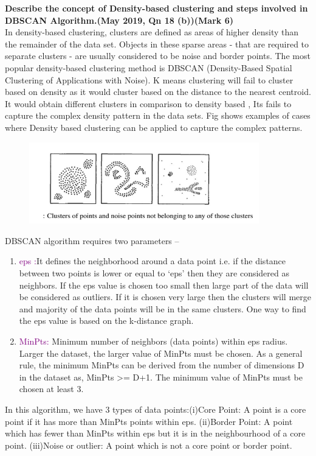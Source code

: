 
\textbf{\textcolor{LightMagenta}{Describe the concept of Density-based clustering and steps involved in DBSCAN Algorithm.(May 2019, Qn 18 (b))\hfill (Mark 6)}} \\[5pt]
In density-based clustering, clusters are defined as areas of higher density than the remainder of the data set. Objects in these sparse areas - that are required to separate clusters - are usually considered to be noise and border points. The most popular density-based clustering method is DBSCAN (Density-Based Spatial Clustering of Applications with Noise). K means clustering will fail to cluster based on density as it would cluster based on the distance to the nearest centroid. It would obtain different clusters in comparison to density based , Its fails to capture the complex density pattern in the data sets. 
Fig shows examples of cases where Density based clustering can be applied to capture the complex patterns.
\begin{figure}[htp]
    \centering
    \includegraphics[width=10cm]{Images/A39_img1.png}
 \end{figure}

DBSCAN algorithm requires two parameters –

\begin{enumerate}
    \item \textcolor{purple}{eps :}It defines the neighborhood around a data point i.e. if the distance between two points is lower or equal to ‘eps’ then they are considered as neighbors. If the eps value is chosen too small then large part of the data will be considered as outliers. If it is chosen very large then the clusters will merge and majority of the data points will be in the same clusters. One way to find the eps value is based on the k-distance graph.
    \item \textcolor{purple}{MinPts:} Minimum number of neighbors (data points) within eps radius. Larger the dataset, the larger value of MinPts must be chosen. As a general rule, the minimum MinPts can be derived from the number of dimensions D in the dataset as, MinPts >= D+1. The minimum value of MinPts must be chosen at least 3.
\end{enumerate}
In this algorithm, we have 3 types of data points:(i)Core Point: A point is a core point if it has more than MinPts points within eps.
(ii)Border Point: A point which has fewer than MinPts within eps but it is in the neighbourhood of a core point.
(iii)Noise or outlier: A point which is not a core point or border point.


